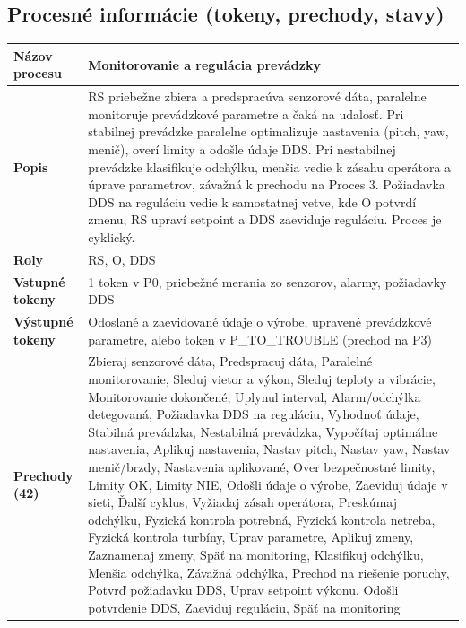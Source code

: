 \documentclass[12pt,a4paper]{article}
\begin{document}
\noindent
\subsection{Procesné informácie (tokeny, prechody, stavy)}
\begin{table}[H]
  \centering
  \renewcommand{\arraystretch}{1.2}
  \begin{tabularx}{\textwidth}{|p{}|X|}
    \hline
    \textbf{Názov procesu} & Monitorovanie a regulácia prevádzky \\
    \hline
    \textbf{Popis} & RS priebežne zbiera a predspracúva senzorové dáta, paralelne monitoruje prevádzkové parametre a čaká na udalosť. Pri stabilnej prevádzke paralelne optimalizuje nastavenia (pitch, yaw, menič), overí limity a odošle údaje DDS. Pri nestabilnej prevádzke klasifikuje odchýlku, menšia vedie k zásahu operátora a úprave parametrov, závažná k prechodu na Proces 3. Požiadavka DDS na reguláciu vedie k samostatnej vetve, kde O potvrdí zmenu, RS upraví setpoint a DDS zaeviduje reguláciu. Proces je cyklický. \\
    \hline
    \textbf{Roly} & RS, O, DDS \\
    \hline
    \textbf{Vstupné tokeny} & 1 token v P0, priebežné merania zo senzorov, alarmy, požiadavky DDS \\
    \hline
    \textbf{Výstupné tokeny} & Odoslané a zaevidované údaje o výrobe, upravené prevádzkové parametre, alebo token v P\_TO\_TROUBLE (prechod na P3) \\
    \hline
    \textbf{Prechody (42)} & Zbieraj senzorové dáta, Predspracuj dáta, Paralelné monitorovanie, Sleduj vietor a výkon, Sleduj teploty a vibrácie, Monitorovanie dokončené, Uplynul interval, Alarm/odchýlka detegovaná, Požiadavka DDS na reguláciu, Vyhodnoť údaje, Stabilná prevádzka, Nestabilná prevádzka, Vypočítaj optimálne nastavenia, Aplikuj nastavenia, Nastav pitch, Nastav yaw, Nastav menič/brzdy, Nastavenia aplikované, Over bezpečnostné limity, Limity OK, Limity NIE, Odošli údaje o výrobe, Zaeviduj údaje v sieti, Ďalší cyklus, Vyžiadaj zásah operátora, Preskúmaj odchýlku, Fyzická kontrola potrebná, Fyzická kontrola netreba, Fyzická kontrola turbíny, Uprav parametre, Aplikuj zmeny, Zaznamenaj zmeny, Späť na monitoring, Klasifikuj odchýlku, Menšia odchýlka, Závažná odchýlka, Prechod na riešenie poruchy, Potvrď požiadavku DDS, Uprav setpoint výkonu, Odošli potvrdenie DDS, Zaeviduj reguláciu, Späť na monitoring \\

\end{tabularx}
\end{table}
\end{document}
